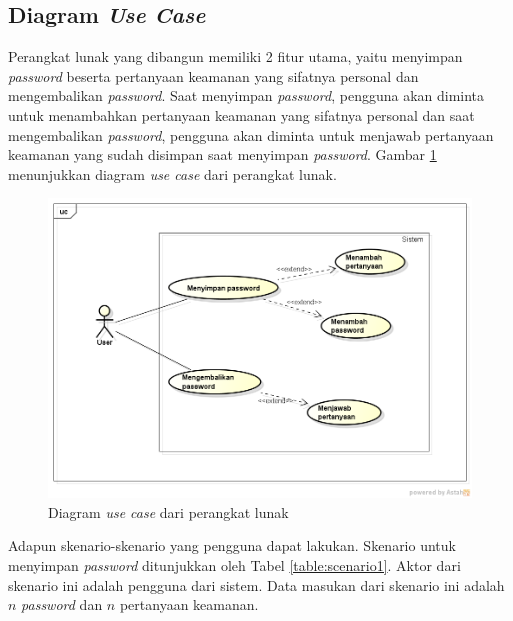 \subsection{Diagram \textit{Use Case}}

Perangkat lunak yang dibangun memiliki 2 fitur utama, yaitu menyimpan \textit{password} beserta pertanyaan keamanan yang sifatnya personal dan mengembalikan \textit{password}. Saat menyimpan \textit{password}, pengguna akan diminta untuk menambahkan pertanyaan keamanan yang sifatnya personal dan saat mengembalikan \textit{password}, pengguna akan diminta untuk menjawab pertanyaan keamanan yang sudah disimpan saat menyimpan \textit{password}. Gambar \ref{fig:use_case} menunjukkan diagram \textit{use case} dari perangkat lunak.

\begin{figure}[H]
	\centerline{\includegraphics[scale=0.5]{Gambar/use_case}}
	\caption{Diagram \textit{use case} dari perangkat lunak}\label{fig:use_case}
\end{figure}

Adapun skenario-skenario yang pengguna dapat lakukan. Skenario untuk menyimpan \textit{password} ditunjukkan oleh Tabel \ref{table:scenario1}. Aktor dari skenario ini adalah pengguna dari sistem. Data masukan dari skenario ini adalah $n$ \textit{password} dan $n$ pertanyaan keamanan.

